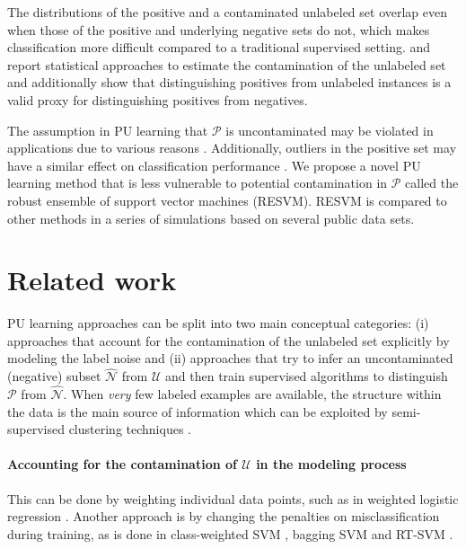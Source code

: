 \documentclass[preprint,elsarticle-num,12pt]{elsarticle}
\newcommand{\posset}{\mathcal{P}}
\newcommand{\unlset}{\mathcal{U}}
\begin{document}
The distributions of the positive and a contaminated unlabeled set overlap even when those of the positive and underlying negative sets do not, which makes classification more difficult compared to a traditional supervised setting. \citet{Elkan:2008:LCO:1401890.1401920} and \citet{blanchard2010semi} report statistical approaches to estimate the contamination of the unlabeled set and additionally show that distinguishing positives from unlabeled instances is a valid proxy for distinguishing positives from negatives.


The assumption in PU learning that $\mathcal{P}$ is uncontaminated may be violated in applications due to various reasons \citep{frenay}. Additionally, outliers in the positive set may have a similar effect on classification performance \citep{pechenizkiy2006class}. We propose a novel PU learning method that is less vulnerable to potential contamination in $\mathcal{P}$ called the robust ensemble of support vector machines (RESVM). RESVM is compared to other methods in a series of simulations based on several public data sets.


\section{Related work}
PU learning approaches can be split into two main conceptual categories: (i) approaches that account for the contamination of the unlabeled set explicitly by modeling the label noise and (ii) approaches that try to infer an uncontaminated (negative) subset $\hat{\mathcal{N}}$ from $\unlset$ and then train supervised algorithms to distinguish $\posset$ from $\hat{\mathcal{N}}$. When \emph{very} few labeled examples are available, the structure within the data is the main source of information which can be exploited by semi-supervised clustering techniques \citep{bksc2}. 

\paragraph{Accounting for the contamination of $\mathcal{U}$ in the modeling process}
This can be done by weighting individual data points, such as in weighted logistic regression \citep{Elkan:2008:LCO:1401890.1401920,Lee03learningwith}. Another approach is by changing the penalties on misclassification during training, as is done in class-weighted SVM \citep{Liu:2003:BTC:951949.952139}, bagging SVM \citep{mordelet2014bagging} and RT-SVM \citep{Liu:2005:PSC:2138033.2138052}. 
\end{document}

